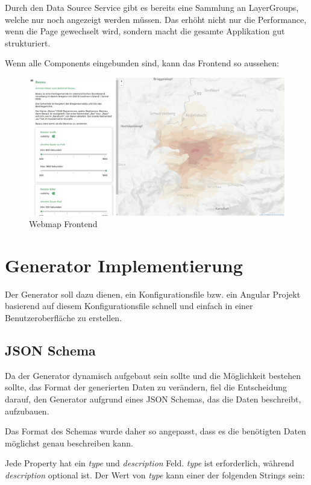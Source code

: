 Durch den Data Source Service gibt es bereits eine Sammlung an LayerGroups, welche nur noch angezeigt werden müssen.
Das erhöht nicht nur die Performance, wenn die Page gewechselt wird, sondern macht die gesamte Applikation gut strukturiert.

Wenn alle Components eingebunden sind, kann das Frontend so aussehen:
\begin{figure}[hbt!]
    \centering
    \includegraphics[scale=.3]{pics/webmap-frontend}
    \caption{Webmap Frontend}
    \label{fig:webmap-frontend}
\end{figure}


\section{Generator Implementierung}
Der Generator soll dazu dienen, ein Konfigurationsfile bzw. ein Angular Projekt basierend auf diesem Konfigurationsfile
schnell und einfach in einer Benutzeroberfläche zu erstellen.

\subsection{JSON Schema}
Da der Generator dynamisch aufgebaut sein sollte und die Möglichkeit bestehen sollte, das Format der generierten
Daten zu verändern, fiel die Entscheidung darauf, den Generator aufgrund eines JSON Schemas, das die Daten beschreibt,
aufzubauen.

Das Format des Schemas wurde daher so angepasst, dass es die benötigten Daten möglichst genau beschreiben kann.

Jede Property hat ein \textit{type} und \textit{description} Feld.
\textit{type} ist erforderlich, während \textit{description} optional ist.
Der Wert von \textit{type} kann einer der folgenden Strings sein:

